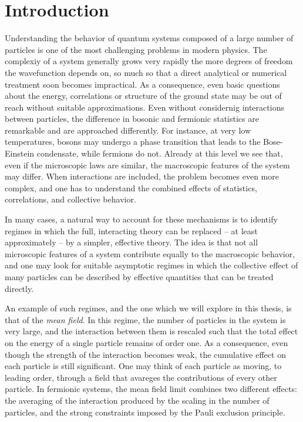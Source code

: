 \chapter*{Introduction}

Understanding the behavior of quantum systems composed of a large number of particles
is one of the most challenging problems in modern physics. The complexiy of a system generally
grows very rapidly the more degrees of freedom the wavefunction depends on, so much so that
a direct analytical or numerical treatment soon becomes impractical. As a consequence, even
basic questions about the energy, correlations or structure of the ground state may be out of
reach without suitable approximations.
Even without considernig interactions between particles, the difference in bosonic and
fermionic statistics are remarkable and are approached differently. For instance, at very low
temperatures, bosons may undergo a phase transition that leads to the Bose-Einstein
condensate, while fermions do not. Already at this level we see that,
even if the microscopic laws are similar, the macroscopic features of the system may differ.
When interactions are included, the problem becomes even more complex, and one has to
understand the combined effects of statistics, correlations, and collective behavior.

In many cases, a natural way to account for these mechanisms is to identify regimes in which
the full, interacting theory can be replaced -- at least approximately -- by a simpler,
effective theory. The idea is that not all microscopic features of a system contribute equally
to the macroscopic behavior, and one may look for suitable asymptotic regimes in which
the collective effect of many particles can be described by effective quantities that can
be treated directly.

An example of such regimes, and the one which we will explore in this thesis, is that of the
\textit{mean field}. In this regime, the number of particles in the system is
very large, and the interaction between them is rescaled such that the total effect on the
energy of a single particle remains of order one. As a consequence, even though the strength
of the interaction becomes weak, the cumulative effect on each particle is still significant.
One may think of each particle as moving, to leading order, through a field that avareges the
contributions of every other particle. In fermionic systems, the mean field limit combines
two different effects: the averaging of the interaction produced by the scaling in the number
of particles, and the strong constraints imposed by the Pauli exclusion principle.

